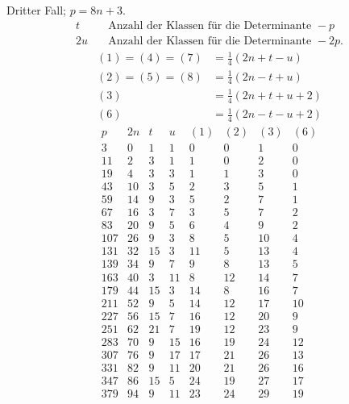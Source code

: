 \clearpage
Dritter Fall; $p=8n+3$.
\[
\begin{aligned}
t&\quad\text{Anzahl der Klassen für die Determinante }-p\\
2u&\quad\text{Anzahl der Klassen für die Determinante }-2p.
\end{aligned}
\]
\[
\begin{aligned}
(1)=(4)=(7)&=\tfrac14(2n+t-u)\\
(2)=(5)=(8)&=\tfrac14(2n-t+u)\\
(3)&=\tfrac14(2n+t+u+2)\\
(6)&=\tfrac14(2n-t-u+2)
\end{aligned}
\]
\[
\begin{array}{r|r|r|r|r|r|r|r}
p&2n&t&u&(1)&(2)&(3)&(6)\\\hline
3&0&1&1&0&0&1&0\\
11&2&3&1&1&0&2&0\\
19&4&3&3&1&1&3&0\\
43&10&3&5&2&3&5&1\\
59&14&9&3&5&2&7&1\\
67&16&3&7&3&5&7&2\\
83&20&9&5&6&4&9&2\\
107&26&9&3&8&5&10&4\\
131&32&15&3&11&5&13&4\\
139&34&9&7&9&8&13&5\\
163&40&3&11&8&12&14&7\\
179&44&15&3&14&8&16&7\\
211&52&9&5&14&12&17&10\\
227&56&15&7&16&12&20&9\\
251&62&21&7&19&12&23&9\\
283&70&9&15&16&19&24&12\\
307&76&9&17&17&21&26&13\\
331&82&9&11&20&21&26&16\\
347&86&15&5&24&19&27&17\\
379&94&9&11&23&24&29&19
\end{array}
\]

